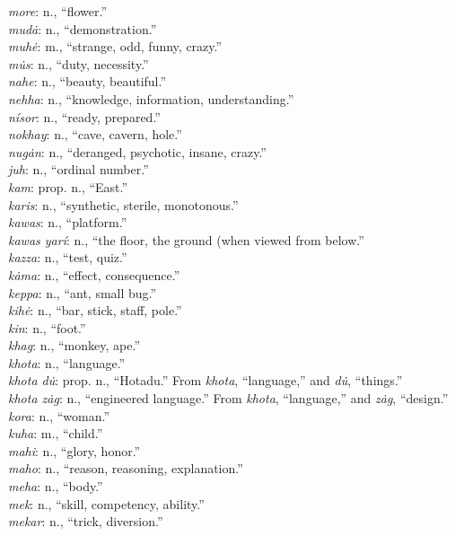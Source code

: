 \documentclass{article}[10pt]
\begin{document}
\begin{multicols}{3}
\emph{more}: n., ``flower.''\\
\emph{mud\.{a}}: n., ``demonstration.''\\
\emph{muh\.{e}}: m., ``strange, odd, funny, crazy.''\\
\emph{m\.{u}s}: n., ``duty, necessity.''\\
\emph{nahe}: n., ``beauty, beautiful.''\\
\emph{nehha}: n., ``knowledge, information, understanding.''\\
\emph{n\'{i}sor}: n., ``ready, prepared.''\\ 
\emph{nokhay}: n., ``cave, cavern, hole.''\\
\emph{nug\.{a}n}: n., ``deranged, psychotic, insane, crazy.''\\
\emph{juh}: n., ``ordinal number.''\\
\emph{kam}: prop. n., ``East.''\\
\emph{karis}: n., ``synthetic, sterile, monotonous.''\\
\emph{kawas}: n., ``platform.''\\
\emph{kawas yar\'{i}}: n., ``the floor, the ground (when viewed from below.''\\
\emph{kazza}: n., ``test, quiz.''\\
\emph{k\.{a}ma}: n., ``effect, consequence.''\\
\emph{keppa}: n., ``ant, small bug.''\\
\emph{kih\.{e}}: n., ``bar, stick, staff, pole.''\\
\emph{kin}: n., ``foot.''\\
\emph{khag}: n., ``monkey, ape.''\\
\emph{khota}: n., ``language.''\\
\emph{khota d\.{u}}: prop. n., ``Hotadu.'' From \emph{khota}, ``language,'' and \emph{d\.{u}}, ``things.''\\
\emph{khota z\.{a}g}: n., ``engineered language.'' From \emph{khota}, ``language,'' and \emph{z\.{a}g}, ``design.''\\
\emph{kora}: n., ``woman.''\\
\emph{kuha}: m., ``child.''\\
\emph{mahi}: n., ``glory, honor.''\\
\emph{maho}: n., ``reason, reasoning, explanation.''\\
\emph{meha}: n., ``body.''\\
\emph{mek}: n., ``skill, competency, ability.''\\
\emph{mekar}: n., ``trick, diversion.''\\

\end{multicols}
\end{document}
